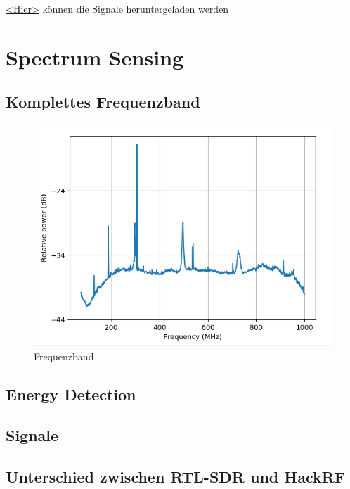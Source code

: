 \documentclass[12pt,a4paper]{article}
\begin{document}
\href{https://mega.nz/file/yswnkBzL#qnNt3vmIuQk8qwFkkHqkzqYDX57jLkB02acP9fccV-s}
{<Hier>} können die Signale heruntergeladen werden


\newpage
\section{Spectrum Sensing}

\subsection*{Komplettes Frequenzband}

\begin{figure}[hbt!]
	\centering
		\includegraphics[width=1\textwidth ]
		{Bilder/A3_full_frequency_band.png}
		\caption{Frequenzband}
\end{figure}



\subsection*{Energy Detection}

\subsection*{Signale}

\subsection*{Unterschied zwischen RTL-SDR und HackRF}
\end{document}
